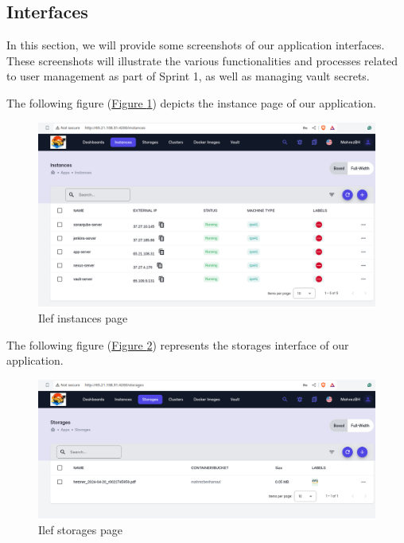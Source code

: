 \subsection{Interfaces}
In this section, we will provide some screenshots of our application interfaces. These screenshots will illustrate the various functionalities and processes related to user management as part of Sprint 1, as well as managing vault secrets. 

The following figure (\hyperref[fig:instances]{Figure \ref{fig:instances}})  depicts the instance page of our application.
\begin{figure}[h]
  \center
  \includegraphics[width=13cm]{./chapters/sprint2/instances.png}
  \caption{Ilef instances page}
  \label{fig:instances}
\end{figure}


The following figure (\hyperref[fig:storages]{Figure \ref{fig:storages}}) represents the storages interface of our application.

\begin{figure}[h]
  \center
  \includegraphics[width=15cm]{./chapters/sprint2/storages.png}
  \caption{Ilef storages page}
  \label{fig:storages}
\end{figure}

